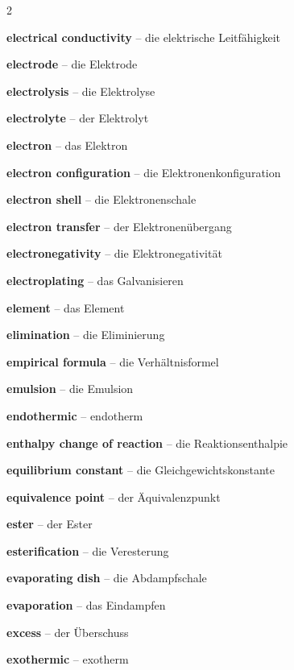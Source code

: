 \begin{multicols}{2}
\par\nopagebreak
\textbf{electrical conductivity} -- die elektrische Leitfähigkeit\dotfill\hyperref[e:27]{\pageref*{e:27}}\par
\textbf{electrode} -- die Elektrode\dotfill\hyperref[e:197]{\pageref*{e:197}}\par
\textbf{electrolysis} -- die Elektrolyse\dotfill\hyperref[e:195]{\pageref*{e:195}}\par
\textbf{electrolyte} -- der Elektrolyt\dotfill\hyperref[e:196]{\pageref*{e:196}}\par
\textbf{electron} -- das Elektron\dotfill\hyperref[e:76]{\pageref*{e:76}}\par
\textbf{electron configuration} -- die Elektronenkonfiguration\dotfill\hyperref[e:79]{\pageref*{e:79}}\par
\textbf{electron shell} -- die Elektronenschale\dotfill\hyperref[e:77]{\pageref*{e:77}}\par
\textbf{electron transfer} -- der Elektronenübergang\dotfill\hyperref[e:189]{\pageref*{e:189}}\par
\textbf{electronegativity} -- die Elektronegativität\dotfill\hyperref[e:98]{\pageref*{e:98}}\par
\textbf{electroplating} -- das Galvanisieren\dotfill\hyperref[e:205]{\pageref*{e:205}}\par
\textbf{element} -- das Element\dotfill\hyperref[e:3]{\pageref*{e:3}}\par
\textbf{elimination} -- die Eliminierung\dotfill\hyperref[e:230]{\pageref*{e:230}}\par
\textbf{empirical formula} -- die Verhältnisformel\dotfill\hyperref[e:104]{\pageref*{e:104}}\par
\textbf{emulsion} -- die Emulsion\dotfill\hyperref[e:16]{\pageref*{e:16}}\par
\textbf{endothermic} -- endotherm\dotfill\hyperref[e:139]{\pageref*{e:139}}\par
\textbf{enthalpy change of reaction} -- die Reaktionsenthalpie\dotfill\hyperref[e:140]{\pageref*{e:140}}\par
\textbf{equilibrium constant} -- die Gleichgewichtskonstante\dotfill\hyperref[e:146]{\pageref*{e:146}}\par
\textbf{equivalence point} -- der Äquivalenzpunkt\dotfill\hyperref[e:175]{\pageref*{e:175}}\par
\textbf{ester} -- der Ester\dotfill\hyperref[e:224]{\pageref*{e:224}}\par
\textbf{esterification} -- die Veresterung\dotfill\hyperref[e:225]{\pageref*{e:225}}\par
\textbf{evaporating dish} -- die Abdampfschale\dotfill\hyperref[e:48]{\pageref*{e:48}}\par
\textbf{evaporation} -- das Eindampfen\dotfill\hyperref[e:34]{\pageref*{e:34}}\par
\textbf{excess} -- der Überschuss\dotfill\hyperref[e:260]{\pageref*{e:260}}\par
\textbf{exothermic} -- exotherm\dotfill\hyperref[e:138]{\pageref*{e:138}}\par


\end{multicols}
